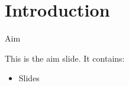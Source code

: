 \section{Introduction}

\begin{frame}{Aim}

This is the aim slide.
It contains:

\begin{itemize}
\item Slides
\end{itemize}

\end{frame}